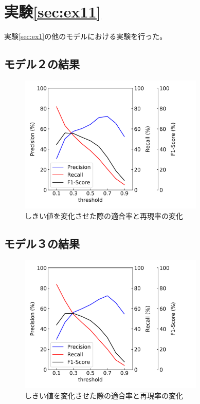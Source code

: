 \section{実験\ref{sec:ex11}}
実験\ref{sec:ex1}の他のモデルにおける実験を行った。

\subsection{モデル２の結果}
\begin{figure}[htbp]
    \begin{center}
        \includegraphics[width=88mm]{./fig/densenet121_e_p02threshold.png}
        \caption{しきい値を変化させた際の適合率と再現率の変化}
        \label{fig:densenet121_e_result_threshold}
    \end{center}
\end{figure}

\newpage
\subsection{モデル３の結果}
\begin{figure}[htbp]
    \begin{center}
        \includegraphics[width=88mm]{./fig/densenet161threshold.png}
        \caption{しきい値を変化させた際の適合率と再現率の変化}
        \label{fig:densenet161_result_threshold}
    \end{center}
\end{figure}

